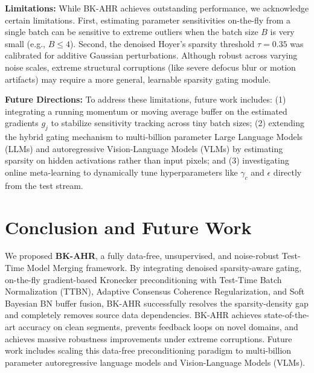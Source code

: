 \documentclass{article}
\theoremstyle{plain}
\theoremstyle{definition}
\theoremstyle{remark}
\begin{document}
\textbf{Limitations:}
While BK-AHR achieves outstanding performance, we acknowledge certain limitations. First, estimating parameter sensitivities on-the-fly from a single batch can be sensitive to extreme outliers when the batch size $B$ is very small (e.g., $B \le 4$). Second, the denoised Hoyer's sparsity threshold $\tau = 0.35$ was calibrated for additive Gaussian perturbations. Although robust across varying noise scales, extreme structural corruptions (like severe defocus blur or motion artifacts) may require a more general, learnable sparsity gating module.

\textbf{Future Directions:}
To address these limitations, future work includes: (1) integrating a running momentum or moving average buffer on the estimated gradients $g_j$ to stabilize sensitivity tracking across tiny batch sizes; (2) extending the hybrid gating mechanism to multi-billion parameter Large Language Models (LLMs) and autoregressive Vision-Language Models (VLMs) by estimating sparsity on hidden activations rather than input pixels; and (3) investigating online meta-learning to dynamically tune hyperparameters like $\gamma_c$ and $\epsilon$ directly from the test stream.

\section{Conclusion and Future Work}
\label{sec:conclusion}

We proposed \textbf{BK-AHR}, a fully data-free, unsupervised, and noise-robust Test-Time Model Merging framework. By integrating denoised sparsity-aware gating, on-the-fly gradient-based Kronecker preconditioning with Test-Time Batch Normalization (TTBN), Adaptive Consensus Coherence Regularization, and Soft Bayesian BN buffer fusion, BK-AHR successfully resolves the sparsity-density gap and completely removes source data dependencies. BK-AHR achieves state-of-the-art accuracy on clean segments, prevents feedback loops on novel domains, and achieves massive robustness improvements under extreme corruptions. Future work includes scaling this data-free preconditioning paradigm to multi-billion parameter autoregressive language models and Vision-Language Models (VLMs).



\end{document}
